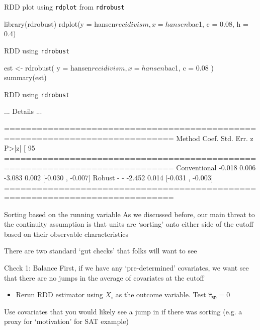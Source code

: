 \documentclass[aspectratio=169,t,11pt,table]{beamer}
\begin{document}
\begin{frame}[fragile]{RDD plot using \texttt{rdplot} from \texttt{rdrobust}}{}
	\begin{codeblock}
library(rdrobust)
rdplot(y = hansen$recidivism, x = hansen$bac1, c = 0.08, h = 0.4)
	\end{codeblock}
\end{frame}


\begin{frame}[fragile]{RDD using \texttt{rdrobust}}{}
  \begin{codeblock}
est <- rdrobust(
  y = hansen$recidivism, x = hansen$bac1, c = 0.08
)
summary(est)
  \end{codeblock}
\end{frame}

\begin{frame}[fragile]{RDD using \texttt{rdrobust}}{}
  \begin{codeblock}[{}]
... Details ...

=============================================================================
        Method     Coef. Std. Err.         z     P>|z|      [ 95%
=============================================================================
  Conventional    -0.018     0.006    -3.083     0.002    [-0.030 , -0.007]    
        Robust         -         -    -2.452     0.014    [-0.031 , -0.003]    
=============================================================================
  \end{codeblock}
\end{frame}


\begin{frame}{Sorting based on the running variable}{}
  As we discussed before, our main threat to the continuity assumption is that units are `sorting' onto either side of the cutoff based on their observable characteristics

  There are two standard `gut checks' that folks will want to see
\end{frame}

\begin{frame}{Check 1: Balance}{}
  First, if we have any `pre-determined' covariates, we want see that there are no jumps in the average of covariates at the cutoff
  \begin{itemize}
    \item Rerun RDD estimator using $X_i$ as the outcome variable. Test $\hat{\tau}_{\texttt{RD}}= 0$
  \end{itemize}

  \bigskip
  Use covariates that you would likely see a jump in if there was sorting (e.g. a proxy for `motivation' for SAT example)
\end{frame}
\end{document}
